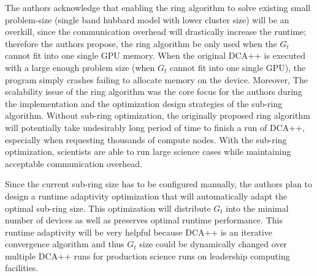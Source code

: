 The authors acknowledge that enabling the ring algorithm 
to solve existing small problem-size 
(single band hubbard model with lower cluster size) 
will be an overkill, since the communication overhead 
will drastically increase the runtime; 
therefore the authors propose, the ring algorithm be 
only used when the $G_t$ cannot fit into one single GPU memory. 
%
When the original DCA++ is executed with a large enough problem size 
(when $G_t$ cannot fit into one single GPU),
the program simply crashes failing to allocate memory on the device. 
%
Moreover, The scalability issue of the ring algorithm 
was the core focus for the authors during the implementation 
and the optimization design strategies of the sub-ring algorithm. 
%
Without sub-ring optimization, the originally proposed ring algorithm 
will potentially take undesirably long period of time 
to finish a run of DCA++, 
especially when requesting thousands of compute nodes. 
%
With the sub-ring optimization, scientists are able to 
run large science cases 
while maintaining acceptable communication overhead. 

Since the current sub-ring size has to be configured manually, 
the authors plan to design a runtime adaptivity optimization 
that will automatically adapt the optimal sub-ring size. 
%
This optimization will distribute $G_t$
into the minimal number of devices as well as 
preserves optimal runtime performance.
%
This runtime adaptivity will be very helpful 
because DCA++ is an iterative convergence algorithm 
and thus $G_t$ size could be 
dynamically changed over multiple DCA++ runs 
for production science runs on leadership computing facilities. 

